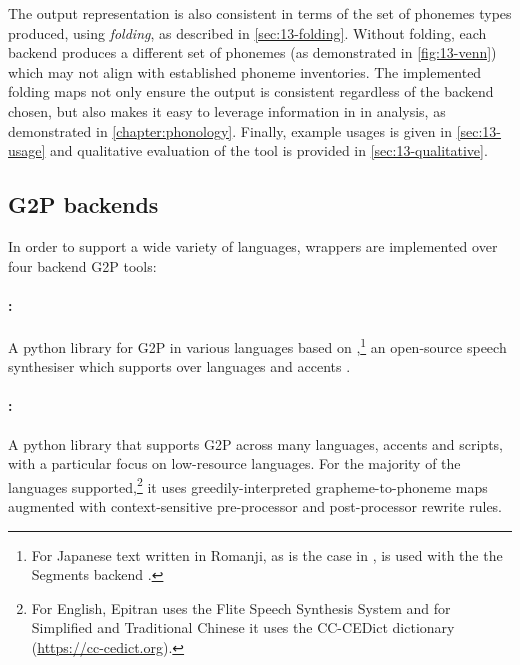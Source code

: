 The output representation is also consistent in terms of the set of phonemes types produced, using \emph{folding}, as described in \cref{sec:13-folding}. Without folding, each backend produces a different set of phonemes (as demonstrated in \cref{fig:13-venn}) which may not align with established phoneme inventories. The implemented folding maps not only ensure the output is consistent regardless of the backend chosen, but also makes it easy to leverage information in \phoible in analysis, as demonstrated in \cref{chapter:phonology}. Finally, example usages is given in \cref{sec:13-usage} and qualitative evaluation of the tool is provided in \cref{sec:13-qualitative}.


\subsection{G2P backends}\label{sec:13-backends}

In order to support a wide variety of languages, wrappers are implemented over four backend G2P tools:

\paragraph{\phonemizer \citep{Bernard2021}:} A python library for G2P in various languages based on ,\footnote{For Japanese text written in Romanji, as is the case in \childes, \phonemizer is used with the the Segments backend \citep{robert_forkel_2019_3549784}.} an open-source speech synthesiser which supports over  languages and accents \citep{Dunn2019}.

\paragraph{\epitran \citep{Mortensen-et-al:2018}:} A python library that supports G2P across many languages, accents and scripts, with a particular focus on low-resource languages. For the majority of the  languages supported,\footnote{For English, Epitran uses the Flite Speech Synthesis System \citep{black2001flite} and for Simplified and Traditional Chinese it uses the CC-CEDict dictionary (\url{https://cc-cedict.org}).} it uses greedily-interpreted grapheme-to-phoneme maps augmented with context-sensitive pre-processor and post-processor rewrite rules.

